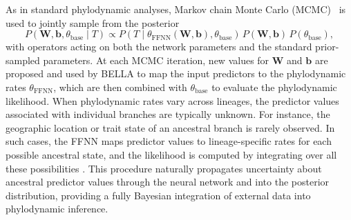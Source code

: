As in standard phylodynamic analyses, Markov chain Monte Carlo (MCMC)~\cite{CHIB20013569} is used to jointly sample from the posterior
\[
    P(\mathbf{W}, \mathbf{b}, \theta_{\text{base}} \mid T)
    \propto
    P(T \mid \theta_{\text{FFNN}}(\mathbf{W}, \mathbf{b}), \theta_{\text{base}}) \,
    P(\mathbf{W}, \mathbf{b}) \,
    P(\theta_{\text{base}}),
\]
with operators acting on both the network parameters and the standard prior-sampled parameters.
At each MCMC iteration, new values for $\mathbf{W}$ and $\mathbf{b}$ are proposed and used by BELLA to map the input predictors to the phylodynamic rates $\theta_{\text{FFNN}}$, which are then combined with $\theta_{\text{base}}$ to evaluate the phylodynamic likelihood.
When phylodynamic rates vary across lineages, the predictor values associated with individual branches are typically unknown.
For instance, the geographic location or trait state of an ancestral branch is rarely observed.
In such cases, the FFNN maps predictor values to lineage-specific rates for each possible ancestral state, and the likelihood is computed by integrating over all these possibilities \cite{Vaughan2025BDMM}.
This procedure naturally propagates uncertainty about ancestral predictor values through the neural network and into the posterior distribution, providing a fully Bayesian integration of external data into phylodynamic inference.
